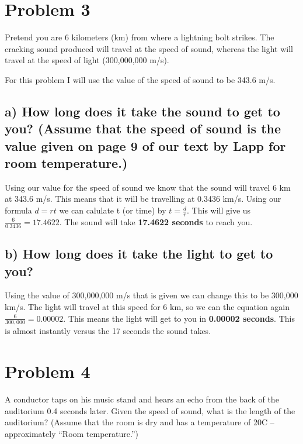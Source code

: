 \documentclass[]{article}
\begin{document}
\section{Problem 3}\label{problem-3}

Pretend you are 6 kilometers (km) from where a lightning bolt strikes.
The cracking sound produced will travel at the speed of sound, whereas
the light will travel at the speed of light (300,000,000 m/s).

For this problem I will use the value of the speed of sound to be 343.6
m/s.

\subsection{a) How long does it take the sound to get to you? (Assume
that the speed of sound is the value given on page 9 of our text by Lapp
for room
temperature.)}\label{a-how-long-does-it-take-the-sound-to-get-to-you-assume-that-the-speed-of-sound-is-the-value-given-on-page-9-of-our-text-by-lapp-for-room-temperature.}

Using our value for the speed of sound we know that the sound will
travel 6 km at 343.6 m/s. This means that it will be travelling at
0.3436 km/s. Using our formula \(d = rt\) we can calulate t (or time) by
\(t = \frac{d}{r}\). This will give us \(\frac6{0.3436} = 17.4622\). The
sound will take \textbf{17.4622 seconds} to reach you.

\subsection{b) How long does it take the light to get to
you?}\label{b-how-long-does-it-take-the-light-to-get-to-you}

Using the value of 300,000,000 m/s that is given we can change this to
be 300,000 km/s. The light will travel at this speed for 6 km, so we can
the equation again \(\frac6{300,000} = 0.00002\). This means the light
will get to you in \textbf{0.00002 seconds}. This is almost instantly
versus the 17 seconds the sound takes.

\section{Problem 4}\label{problem-4}

A conductor taps on his music stand and hears an echo from the back of
the auditorium 0.4 seconds later. Given the speed of sound, what is the
length of the auditorium? (Assume that the room is dry and has a
temperature of 20C -- approximately ``Room temperature.'')
\end{document}
